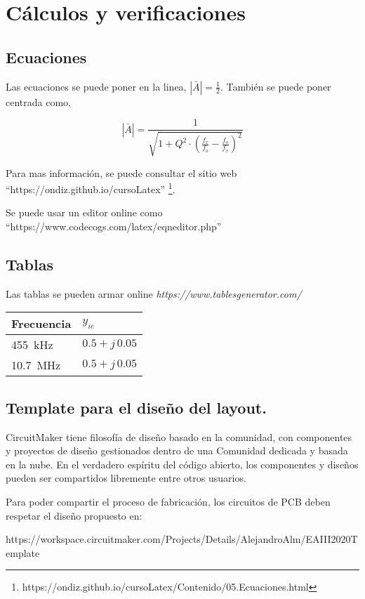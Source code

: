 \section{Cálculos y verificaciones}

\subsection{Ecuaciones}
Las ecuaciones se puede poner en la linea, $|\bar{A}| = \frac{1}{2}$. También se puede poner centrada como,

$$|\bar{A}| = \frac{1}{\sqrt{1+Q^2\cdot (\frac{f_x}{f_o} - \frac{f_o}{f_x})^2}}$$

Para mas información, se puede consultar el sitio web ``https://ondiz.github.io/cursoLatex'' \footnote{https://ondiz.github.io/cursoLatex/Contenido/05.Ecuaciones.html}.

Se puede usar un editor online como ``https://www.codecogs.com/latex/eqneditor.php''

\subsection{Tablas}
Las tablas se pueden armar online \emph{https://www.tablesgenerator.com/}

\begin{table}[h!]
\centering
\begin{tabular}{|l|l|}
\hline
Frecuencia             & $y_{ie}$          \\ \hline
\SI{455}{\kilo\hertz}  & $0.5 + j\, 0.05$  \\ \hline
\SI{10,7}{\mega\hertz} & $0.5 + j\, 0.05$  \\ \hline
\end{tabular}
\end{table}

\subsection{Template para el diseño del layout.}

CircuitMaker tiene filosofía de diseño basado en la comunidad, con componentes y proyectos de diseño gestionados dentro de una Comunidad dedicada y basada en la nube. En el verdadero espíritu del código abierto, los componentes y diseños pueden ser compartidos libremente entre otros usuarios.

Para poder compartir el proceso de fabricación, los circuitos de PCB deben respetar el diseño propuesto en:

https://workspace.circuitmaker.com/Projects/Details/AlejandroAlm/EAIII2020Template

